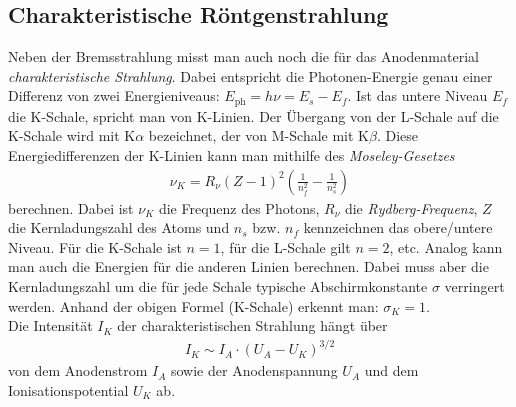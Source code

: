\documentclass[12pt,a4paper,titlepage,headinclude,bibtotoc]{scrartcl}
\begin{document}
\subsection{Charakteristische Röntgenstrahlung}
Neben der Bremsstrahlung misst man auch noch die für das Anodenmaterial \emph{charakteristische Strahlung}.
Dabei entspricht die Photonen-Energie genau einer Differenz von zwei Energieniveaus: $E_\text{ph}=h\nu=E_s-E_f$.
Ist das untere Niveau $E_f$ die K-Schale, spricht man von K-Linien.
Der Übergang von der L-Schale auf die K-Schale wird mit K$\alpha$ bezeichnet, der von M-Schale mit K$\beta$.
Diese Energiedifferenzen der K-Linien kann man mithilfe des \emph{Moseley-Gesetzes}
\begin{align}
	\nu_K=R_\nu (Z-1)^2\left(\frac{1}{n_f^2}-\frac{1}{n_s^2}\right)
\end{align}
berechnen.
Dabei ist $\nu_K$ die Frequenz des Photons, $R_\nu$ die \emph{Rydberg-Frequenz}, $Z$ die Kernladungszahl des Atoms und $n_s$ bzw. $n_f$ kennzeichnen das obere/untere Niveau.
Für die K-Schale ist $n=1$, für die L-Schale gilt $n=2$, etc.
Analog kann man auch die Energien für die anderen Linien berechnen.
Dabei muss aber die Kernladungszahl um die für jede Schale typische Abschirmkonstante $\sigma$ verringert werden.
Anhand der obigen Formel (K-Schale) erkennt man: $\sigma_K=1$.\\

Die Intensität $I_K$ der charakteristischen Strahlung hängt über
\begin{align}
	I_K \sim I_A\cdot(U_A-U_K)^{3/2}
	\label{eq:IntChara}
\end{align}
von dem Anodenstrom $I_A$ sowie der Anodenspannung $U_A$ und dem Ionisationspotential $U_K$ ab.
\end{document}
